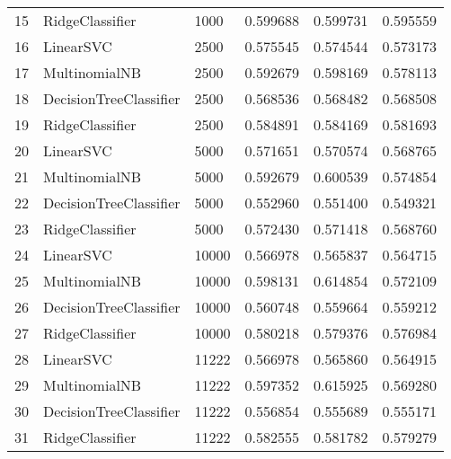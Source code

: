 \begin{longtable}{lllrrr}
15 &         RidgeClassifier &         1000 &  0.599688 &   0.599731 &  0.595559 \\
16 &               LinearSVC &         2500 &  0.575545 &   0.574544 &  0.573173 \\
17 &           MultinomialNB &         2500 &  0.592679 &   0.598169 &  0.578113 \\
18 &  DecisionTreeClassifier &         2500 &  0.568536 &   0.568482 &  0.568508 \\
19 &         RidgeClassifier &         2500 &  0.584891 &   0.584169 &  0.581693 \\
20 &               LinearSVC &         5000 &  0.571651 &   0.570574 &  0.568765 \\
21 &           MultinomialNB &         5000 &  0.592679 &   0.600539 &  0.574854 \\
22 &  DecisionTreeClassifier &         5000 &  0.552960 &   0.551400 &  0.549321 \\
23 &         RidgeClassifier &         5000 &  0.572430 &   0.571418 &  0.568760 \\
24 &               LinearSVC &        10000 &  0.566978 &   0.565837 &  0.564715 \\
25 &           MultinomialNB &        10000 &  0.598131 &   0.614854 &  0.572109 \\
26 &  DecisionTreeClassifier &        10000 &  0.560748 &   0.559664 &  0.559212 \\
27 &         RidgeClassifier &        10000 &  0.580218 &   0.579376 &  0.576984 \\
28 &               LinearSVC &        11222 &  0.566978 &   0.565860 &  0.564915 \\
29 &           MultinomialNB &        11222 &  0.597352 &   0.615925 &  0.569280 \\
30 &  DecisionTreeClassifier &        11222 &  0.556854 &   0.555689 &  0.555171 \\
31 &         RidgeClassifier &        11222 &  0.582555 &   0.581782 &  0.579279 \\
\bottomrule
\end{longtable}
\newpage
